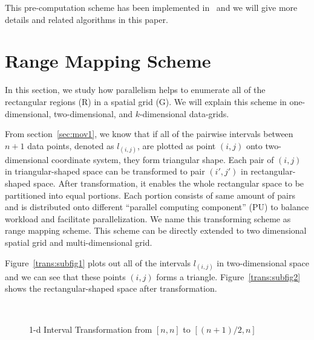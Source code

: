 \documentclass[AMA,LATO1COL]{WileyNJD-v2}
\begin{document}
This pre-computation scheme has been implemented in~\cite{apweb} and we will give more details and related algorithms in this paper.

\section {Range Mapping Scheme} \label{RMS}
In this section, we study how parallelism helps to enumerate all of the rectangular regions (R) in a spatial grid (G). We will explain this scheme in one-dimensional, two-dimensional, and $k$-dimensional data-grids.

From section~\ref{sec:mov1}, we know that if all of the pairwise intervals between $n+1$ data points, denoted as $l_{(i,j)}$, are plotted as point $(i,j)$ onto two-dimensional coordinate system, they form triangular shape. Each pair of $(i,j)$ in triangular-shaped space can be transformed to pair $(i',j')$ in rectangular-shaped space. After transformation, it enables the whole rectangular space to be partitioned into equal portions. Each portion consists of same amount of pairs and is distributed onto different ``parallel computing component'' (PU) to balance workload and facilitate parallelization. We name this transforming scheme as range mapping scheme. This scheme can be directly extended to two dimensional spatial grid and multi-dimensional grid.

Figure~\ref{trans:subfig1} plots out all of the intervals $l_{(i,j)}$ in two-dimensional space and we can see that these points $(i,j)$ forms a triangle. Figure~\ref{trans:subfig2} shows the rectangular-shaped space after transformation.

\begin{figure}[h]
\centering
{}
~~
\caption{1-d Interval Transformation from $[n,n]$ to $[(n+1)/2,n]$}\label{modelBF}
\end{figure}
\end{document}
